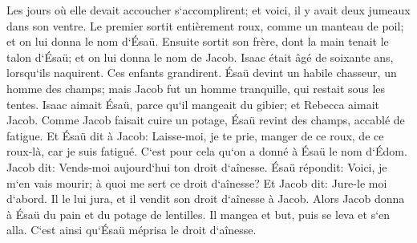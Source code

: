 \verse Les jours où elle devait accoucher s`accomplirent; et voici, il y avait deux jumeaux dans son ventre. 
\verse Le premier sortit entièrement roux, comme un manteau de poil; et on lui donna le nom d`Ésaü. 
\verse Ensuite sortit son frère, dont la main tenait le talon d`Ésaü; et on lui donna le nom de Jacob. Isaac était âgé de soixante ans, lorsqu`ils naquirent. 
\verse Ces enfants grandirent. Ésaü devint un habile chasseur, un homme des champs; mais Jacob fut un homme tranquille, qui restait sous les tentes. 
\verse Isaac aimait Ésaü, parce qu`il mangeait du gibier; et Rebecca aimait Jacob. 
\verse Comme Jacob faisait cuire un potage, Ésaü revint des champs, accablé de fatigue. 
\verse Et Ésaü dit à Jacob: Laisse-moi, je te prie, manger de ce roux, de ce roux-là, car je suis fatigué. C`est pour cela qu`on a donné à Ésaü le nom d`Édom. 
\verse Jacob dit: Vends-moi aujourd`hui ton droit d`aînesse. 
\verse Ésaü répondit: Voici, je m`en vais mourir; à quoi me sert ce droit d`aînesse? 
\verse Et Jacob dit: Jure-le moi d`abord. Il le lui jura, et il vendit son droit d`aînesse à Jacob. 
\verse Alors Jacob donna à Ésaü du pain et du potage de lentilles. Il mangea et but, puis se leva et s`en alla. C`est ainsi qu`Ésaü méprisa le droit d`aînesse. 

